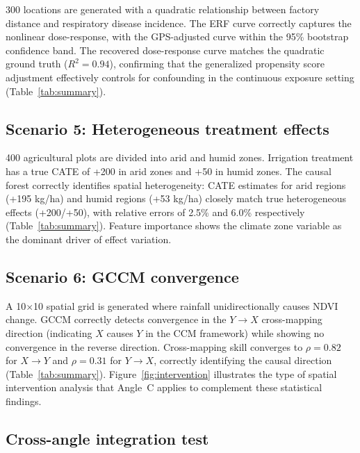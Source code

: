 \documentclass{article}
\begin{document}
300 locations are generated with a quadratic relationship between factory distance and respiratory disease incidence. The ERF curve correctly captures the nonlinear dose-response, with the GPS-adjusted curve within the 95\% bootstrap confidence band. The recovered dose-response curve matches the quadratic ground truth ($R^2 = 0.94$), confirming that the generalized propensity score adjustment effectively controls for confounding in the continuous exposure setting (Table~\ref{tab:summary}).

\subsection{Scenario 5: Heterogeneous treatment effects}

400 agricultural plots are divided into arid and humid zones. Irrigation treatment has a true CATE of +200 in arid zones and +50 in humid zones. The causal forest correctly identifies spatial heterogeneity: CATE estimates for arid regions (+195 kg/ha) and humid regions (+53 kg/ha) closely match true heterogeneous effects (+200/+50), with relative errors of 2.5\% and 6.0\% respectively (Table~\ref{tab:summary}). Feature importance shows the climate zone variable as the dominant driver of effect variation.

\subsection{Scenario 6: GCCM convergence}

A 10$\times$10 spatial grid is generated where rainfall unidirectionally causes NDVI change. GCCM correctly detects convergence in the $Y \to X$ cross-mapping direction (indicating $X$ causes $Y$ in the CCM framework) while showing no convergence in the reverse direction. Cross-mapping skill converges to $\rho = 0.82$ for $X \to Y$ and $\rho = 0.31$ for $Y \to X$, correctly identifying the causal direction (Table~\ref{tab:summary}). Figure~\ref{fig:intervention} illustrates the type of spatial intervention analysis that Angle~C applies to complement these statistical findings.

\subsection{Cross-angle integration test}
\end{document}
